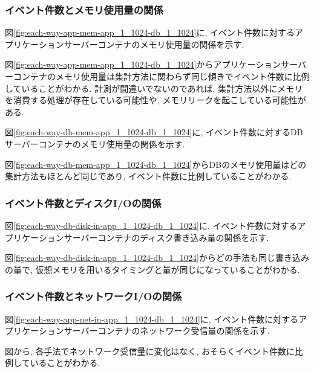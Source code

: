 \documentclass[../../../../main]{subfiles}
\begin{document}
    \subsubsection{イベント件数とメモリ使用量の関係}\label{subsubsubsec:result-each-way-only-limit-mem}

    図\ref{fig:each-way-app-mem-app_1_1024-db_1_1024}に, イベント件数に対するアプリケーションサーバーコンテナのメモリ使用量の関係を示す.

    

    図\ref{fig:each-way-app-mem-app_1_1024-db_1_1024}からアプリケーションサーバーコンテナのメモリ使用量は集計方法に関わらず同じ傾きでイベント件数に比例していることがわかる. 計測が間違いでないのであれば, 集計方法以外にメモリを消費する処理が存在している可能性や, メモリリークを起こしている可能性がある.

    図\ref{fig:each-way-db-mem-app_1_1024-db_1_1024}に, イベント件数に対するDBサーバーコンテナのメモリ使用量の関係を示す.

    

    図\ref{fig:each-way-db-mem-app_1_1024-db_1_1024}からDBのメモリ使用量はどの集計方法もほとんど同じであり, イベント件数に比例していることがわかる.

    \subsubsection{イベント件数とディスクI/Oの関係}\label{subsubsubsec:result-each-way-only-limit-disk-io}

    図\ref{fig:each-way-db-disk-in-app_1_1024-db_1_1024}に, イベント件数に対するアプリケーションサーバーコンテナのディスク書き込み量の関係を示す.

    

    図\ref{fig:each-way-db-disk-in-app_1_1024-db_1_1024}からどの手法も同じ書き込みの量で, 仮想メモリを用いるタイミングと量が同じになっていることがわかる.

    \subsubsection{イベント件数とネットワークI/Oの関係}\label{subsubsubsec:result-each-way-only-limit-net-io}

    図\ref{fig:each-way-app-net-in-app_1_1024-db_1_1024}に, イベント件数に対するアプリケーションサーバーコンテナのネットワーク受信量の関係を示す.

    

    図から, 各手法でネットワーク受信量に変化はなく, おそらくイベント件数に比例していることがわかる.
\end{document}
